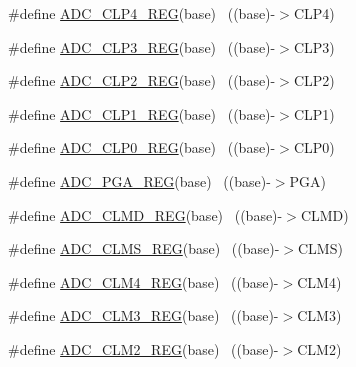 \begin{DoxyCompactItemize}
\#define \hyperlink{group___a_d_c___register___accessor___macros_ga2722b8710cc4793af32d1ca062749691}{A\+D\+C\+\_\+\+C\+L\+P4\+\_\+\+R\+EG}(base)                                          ~((base)-\/$>$C\+L\+P4)
\item 
\#define \hyperlink{group___a_d_c___register___accessor___macros_gad3369cf8ea89b61e025a00e28e48d878}{A\+D\+C\+\_\+\+C\+L\+P3\+\_\+\+R\+EG}(base)                                          ~((base)-\/$>$C\+L\+P3)
\item 
\#define \hyperlink{group___a_d_c___register___accessor___macros_gaf76097bf0d35aba4eb24772209ca9088}{A\+D\+C\+\_\+\+C\+L\+P2\+\_\+\+R\+EG}(base)                                          ~((base)-\/$>$C\+L\+P2)
\item 
\#define \hyperlink{group___a_d_c___register___accessor___macros_ga17d3db4a239c595d8d2ec4fa8b064106}{A\+D\+C\+\_\+\+C\+L\+P1\+\_\+\+R\+EG}(base)                                          ~((base)-\/$>$C\+L\+P1)
\item 
\#define \hyperlink{group___a_d_c___register___accessor___macros_gafd619a5a2718979bc59f90085ac98c17}{A\+D\+C\+\_\+\+C\+L\+P0\+\_\+\+R\+EG}(base)                                          ~((base)-\/$>$C\+L\+P0)
\item 
\#define \hyperlink{group___a_d_c___register___accessor___macros_ga7e77b8e64203db15c157e72b2b4285ee}{A\+D\+C\+\_\+\+P\+G\+A\+\_\+\+R\+EG}(base)                                            ~((base)-\/$>$P\+GA)
\item 
\#define \hyperlink{group___a_d_c___register___accessor___macros_ga42b9eb64ac35d5b5dafcdf46cdaa5da6}{A\+D\+C\+\_\+\+C\+L\+M\+D\+\_\+\+R\+EG}(base)                                          ~((base)-\/$>$C\+L\+MD)
\item 
\#define \hyperlink{group___a_d_c___register___accessor___macros_gaebae30a3ca641d11bf4827c16cf97f40}{A\+D\+C\+\_\+\+C\+L\+M\+S\+\_\+\+R\+EG}(base)                                          ~((base)-\/$>$C\+L\+MS)
\item 
\#define \hyperlink{group___a_d_c___register___accessor___macros_ga9c3a854d793a88e2311f1f03b687e3e0}{A\+D\+C\+\_\+\+C\+L\+M4\+\_\+\+R\+EG}(base)                                          ~((base)-\/$>$C\+L\+M4)
\item 
\#define \hyperlink{group___a_d_c___register___accessor___macros_ga97002f7666f0790f47fc6bd12a083246}{A\+D\+C\+\_\+\+C\+L\+M3\+\_\+\+R\+EG}(base)                                          ~((base)-\/$>$C\+L\+M3)
\item 
\#define \hyperlink{group___a_d_c___register___accessor___macros_ga46547eb78fef1573713d39b1d8c578d5}{A\+D\+C\+\_\+\+C\+L\+M2\+\_\+\+R\+EG}(base)                                          ~((base)-\/$>$C\+L\+M2)

\end{DoxyCompactItemize}
